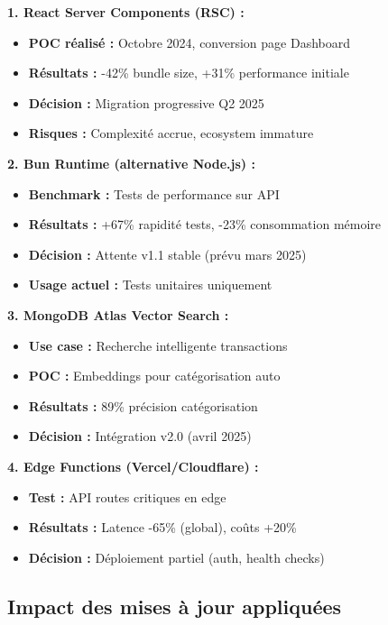 \begin{tcolorbox}[colback=yellow!5!white,colframe=yellow!60!black,title=\textbf{POC et expérimentations Q4 2024}]
\textbf{1. React Server Components (RSC) :}
\begin{itemize}
    \item \textbf{POC réalisé :} Octobre 2024, conversion page Dashboard
    \item \textbf{Résultats :} -42\% bundle size, +31\% performance initiale
    \item \textbf{Décision :} Migration progressive Q2 2025
    \item \textbf{Risques :} Complexité accrue, ecosystem immature
\end{itemize}

\textbf{2. Bun Runtime (alternative Node.js) :}
\begin{itemize}
    \item \textbf{Benchmark :} Tests de performance sur API
    \item \textbf{Résultats :} +67\% rapidité tests, -23\% consommation mémoire
    \item \textbf{Décision :} Attente v1.1 stable (prévu mars 2025)
    \item \textbf{Usage actuel :} Tests unitaires uniquement
\end{itemize}

\textbf{3. MongoDB Atlas Vector Search :}
\begin{itemize}
    \item \textbf{Use case :} Recherche intelligente transactions
    \item \textbf{POC :} Embeddings pour catégorisation auto
    \item \textbf{Résultats :} 89\% précision catégorisation
    \item \textbf{Décision :} Intégration v2.0 (avril 2025)
\end{itemize}

\textbf{4. Edge Functions (Vercel/Cloudflare) :}
\begin{itemize}
    \item \textbf{Test :} API routes critiques en edge
    \item \textbf{Résultats :} Latence -65\% (global), coûts +20\%
    \item \textbf{Décision :} Déploiement partiel (auth, health checks)
\end{itemize}
\end{tcolorbox}

\subsection{Impact des mises à jour appliquées}

